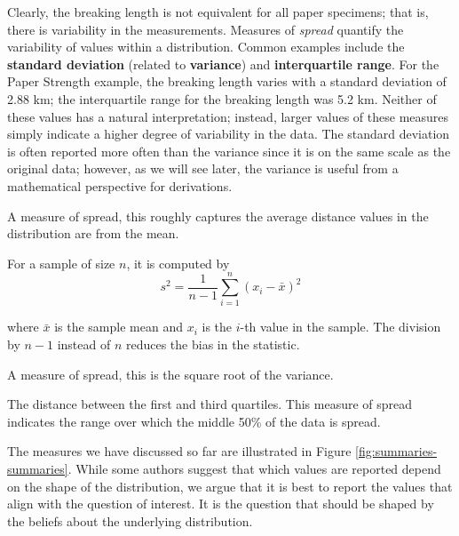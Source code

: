 \documentclass[]{book}
\theoremstyle{definition}
\theoremstyle{definition}
\theoremstyle{remark}
\let\BeginKnitrBlock\begin \let\EndKnitrBlock\end
\begin{document}
Clearly, the breaking length is not equivalent for all paper specimens;
that is, there is variability in the measurements. Measures of
\emph{spread} quantify the variability of values within a distribution.
Common examples include the \textbf{standard deviation} (related to
\textbf{variance}) and \textbf{interquartile range}. For the Paper
Strength example, the breaking length varies with a standard deviation
of 2.88 km; the interquartile range for the breaking length was 5.2 km.
Neither of these values has a natural interpretation; instead, larger
values of these measures simply indicate a higher degree of variability
in the data. The standard deviation is often reported more often than
the variance since it is on the same scale as the original data;
however, as we will see later, the variance is useful from a
mathematical perspective for derivations.

\BeginKnitrBlock{definition}[Variance]
\protect\hypertarget{def:defn-variance}{}{\label{def:defn-variance}
{} }A measure of spread, this roughly captures
the average distance values in the distribution are from the mean.

For a sample of size \(n\), it is computed by
\[s^2 = \frac{1}{n-1}\sum_{i=1}^{n} \left(x_i - \bar{x}\right)^2\]

where \(\bar{x}\) is the sample mean and \(x_i\) is the \(i\)-th value
in the sample. The division by \(n-1\) instead of \(n\) reduces the bias
in the statistic.
\EndKnitrBlock{definition}

\BeginKnitrBlock{definition}[Standard Deviation]
\protect\hypertarget{def:defn-standard-deviation}{}{\label{def:defn-standard-deviation}
{} }A measure of spread, this is the
square root of the variance.
\EndKnitrBlock{definition}

\BeginKnitrBlock{definition}[Interquartile Range]
\protect\hypertarget{def:defn-interquartile-range}{}{\label{def:defn-interquartile-range}
{} }The distance between the first and
third quartiles. This measure of spread indicates the range over which
the middle 50\% of the data is spread.
\EndKnitrBlock{definition}

The measures we have discussed so far are illustrated in Figure
\ref{fig:summaries-summaries}. While some authors suggest that which
values are reported depend on the shape of the distribution, we argue
that it is best to report the values that align with the question of
interest. It is the question that should be shaped by the beliefs about
the underlying distribution.
\end{document}

